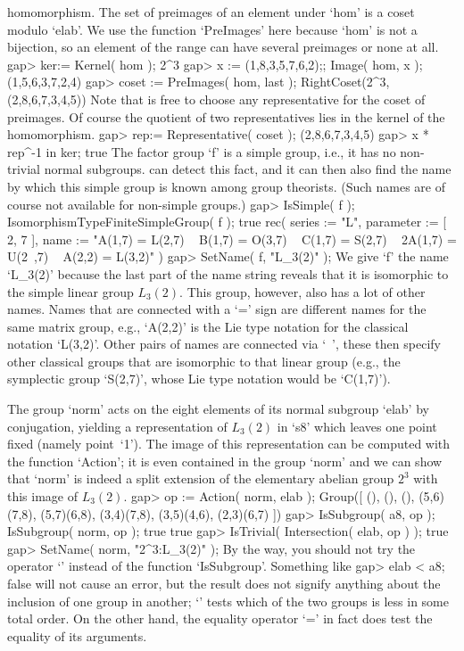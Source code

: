 homomorphism. The set of  preimages of an element under  `hom' is a coset
modulo `elab'. We use the function  `PreImages' here because `hom' is not
a bijection, so an  element of the range can   have several preimages  or
none at all.
\beginexample
gap> ker:= Kernel( hom );
2^3
gap> x := (1,8,3,5,7,6,2);; Image( hom, x );
(1,5,6,3,7,2,4)
gap> coset := PreImages( hom, last );
RightCoset(2^3,(2,8,6,7,3,4,5))
\endexample
Note that {\GAP} is free to choose any representative for the coset
of preimages.
Of course the quotient of two representatives lies in the kernel of
the homomorphism.
\beginexample
gap> rep:= Representative( coset );
(2,8,6,7,3,4,5)
gap> x * rep^-1 in ker;
true
\endexample
The factor  group `f'  is  a simple  group,  i.e., it has  no non-trivial
normal subgroups. {\GAP} can detect this fact,  and it can then also find
the name by which this simple group is known among group theorists. (Such
names are of course not available for non-simple groups.)
\beginexample
gap> IsSimple( f ); IsomorphismTypeFiniteSimpleGroup( f );
true
rec( series := "L", parameter := [ 2, 7 ], 
  name := "A(1,7) = L(2,7) ~ B(1,7) = O(3,7) ~ C(1,7) = S(2,7) ~ 2A(1,7) = U(2\
,7) ~ A(2,2) = L(3,2)" )
gap> SetName( f, "L_3(2)" );
\endexample
We give `f' the name  `L_3(2)' because the  last part of the name  string
reveals that  it is isomorphic to  the simple linear group $L_3(2)$. This
group, however, also has a  lot of other  names. Names that are connected
with a  `=' sign  are different names   for the same matrix group,  e.g.,
`A(2,2)' is the  Lie type notation for  the  classical notation `L(3,2)'.
Other pairs  of  names are  connected via `~',  these then  specify other
classical  groups  that are isomorphic  to that  linear  group (e.g., the
symplectic group `S(2,7)', whose Lie type notation would be `C(1,7)').

The group `norm' acts on the eight elements of its normal subgroup `elab'
by conjugation,  yielding  a representation   of $L_3(2)$ in   `s8' which
leaves one    point  fixed  (namely  point~`1').    The   image of   this
representation can be computed with the function  `Action'; it is even
contained  in the group `norm' and  we can show  that `norm'  is indeed a
split extension of the elementary abelian group $2^3$  with this image of
$L_3(2)$.
\beginexample
gap> op := Action( norm, elab );
Group([ (), (), (), (5,6)(7,8), (5,7)(6,8), (3,4)(7,8), (3,5)(4,6), 
  (2,3)(6,7) ])
gap> IsSubgroup( a8, op ); IsSubgroup( norm, op );
true
true
gap> IsTrivial( Intersection( elab, op ) );
true
gap> SetName( norm, "2^3:L_3(2)" );
\endexample
By the way, you should not try the operator `\<'  instead of the function
`IsSubgroup'. Something like
\beginexample
gap> elab < a8;
false
\endexample
will not cause an error, but the result does not signify anything about the
inclusion of one group in another; `\<' tests  which of the two groups is
less in some total order. On the other hand, the equality operator `=' in
fact does test the equality of its arguments.

